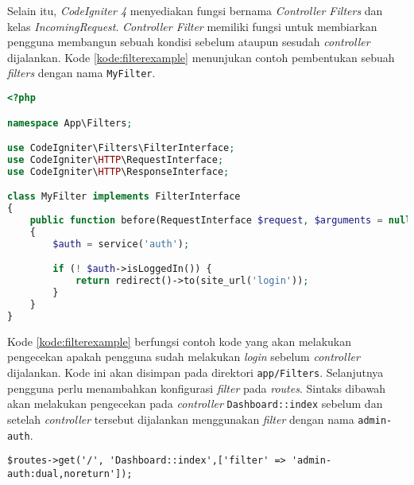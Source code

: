 Selain itu, \textit{CodeIgniter 4} menyediakan fungsi bernama \textit{Controller Filters} dan kelas \textit{IncomingRequest}. \textit{Controller Filter} memiliki fungsi untuk membiarkan pengguna membangun sebuah kondisi sebelum ataupun sesudah \textit{controller} dijalankan. Kode \ref{kode:filterexample} menunjukan contoh pembentukan sebuah \textit{filters} dengan nama \texttt{MyFilter}.

\begin{lstlisting}[language=PHP, caption=Contoh \textit{Controllers Filters} pada \textit{CodeIgniter 4},label=kode:filterexample]
<?php

namespace App\Filters;

use CodeIgniter\Filters\FilterInterface;
use CodeIgniter\HTTP\RequestInterface;
use CodeIgniter\HTTP\ResponseInterface;

class MyFilter implements FilterInterface
{
    public function before(RequestInterface $request, $arguments = null)
    {
        $auth = service('auth');

        if (! $auth->isLoggedIn()) {
            return redirect()->to(site_url('login'));
        }
    }
}
\end{lstlisting}

Kode \ref{kode:filterexample} berfungsi contoh kode yang akan melakukan pengecekan apakah pengguna sudah melakukan \textit{login} sebelum \textit{controller} dijalankan. Kode ini akan disimpan pada direktori \texttt{app/Filters}. Selanjutnya pengguna perlu menambahkan konfigurasi \textit{filter} pada \textit{routes}. Sintaks dibawah akan melakukan pengecekan pada \textit{controller} \texttt{Dashboard::index} sebelum dan setelah \textit{controller} tersebut dijalankan menggunakan \textit{filter} dengan nama \texttt{admin-auth}.
\begin{center}
	\verb|$routes->get('/', 'Dashboard::index',['filter' => 'admin-auth:dual,noreturn']);|
\end{center}

